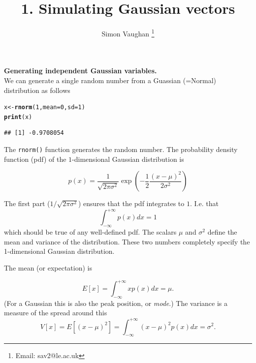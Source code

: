 \documentclass[a4paper,11pt]{article}\usepackage[]{graphicx}\usepackage[]{color}
\makeatletter
\newcommand{\hlnum}[1]{\textcolor[rgb]{0.686,0.059,0.569}{#1}}%
\newcommand{\hlstd}[1]{\textcolor[rgb]{0.345,0.345,0.345}{#1}}%
\newcommand{\hlkwb}[1]{\textcolor[rgb]{0.69,0.353,0.396}{#1}}%
\newcommand{\hlkwc}[1]{\textcolor[rgb]{0.333,0.667,0.333}{#1}}%
\newcommand{\hlkwd}[1]{\textcolor[rgb]{0.737,0.353,0.396}{\textbf{#1}}}%
\newenvironment{kframe}{%
 \def\at@end@of@kframe{}%
 \ifinner\ifhmode%
  \def\at@end@of@kframe{\end{minipage}}%
  \begin{minipage}{\columnwidth}%
 \fi\fi%
 \def\FrameCommand##1{\hskip\@totalleftmargin \hskip-\fboxsep
 \colorbox{shadecolor}{##1}\hskip-\fboxsep
     \hskip-\linewidth \hskip-\@totalleftmargin \hskip\columnwidth}%
 \MakeFramed {\advance\hsize-\width
   \@totalleftmargin\z@ \linewidth\hsize
   \@setminipage}}%
 {\par\unskip\endMakeFramed%
 \at@end@of@kframe}
\newenvironment{knitrout}{}{} %
\makeatother
\begin{document}
\title{1. Simulating Gaussian vectors}
\author{Simon Vaughan \thanks{Email: sav2@le.ac.uk}}
\maketitle

\textbf{Generating independent Gaussian variables.} \\

We can generate a single random number from a Guassian (=Normal) distribution as follows

\begin{knitrout}
\color{fgcolor}\begin{kframe}
\begin{alltt}
  \hlstd{x} \hlkwb{<-} \hlkwd{rnorm}\hlstd{(}\hlnum{1}\hlstd{,} \hlkwc{mean} \hlstd{=} \hlnum{0}\hlstd{,} \hlkwc{sd} \hlstd{=} \hlnum{1}\hlstd{)}
  \hlkwd{print}\hlstd{(x)}
\end{alltt}
\begin{verbatim}
## [1] -0.9708054
\end{verbatim}
\end{kframe}
\end{knitrout}

The {\tt rnorm()} function generates the random number. The probability density function (pdf) of the $1$-dimensional Gaussian distribution is

\begin{equation}
  p(x) = \frac{1}{\sqrt{2 \pi \sigma^2}} 
  \exp \left( -\frac{1}{2} \frac{ (x-\mu)^2 }{ 2\sigma^2 } \right)
  \label{eqn:norm1}
\end{equation}

The first part ($1/\sqrt{2 \pi \sigma^2}$) ensures that the pdf integrates to $1$. I.e. that
\begin{equation}
  \int_{-\infty}^{+\infty} p(x) dx = 1
\end{equation}
which should be true of any well-defined pdf. The scalars $\mu$ and $\sigma^2$ define the mean and variance of the distribution. These two numbers completely specify the 1-dimensional Gaussian distribution. 

The mean (or expectation) is 

\begin{equation}
  E[x] = \int_{-\infty}^{+\infty} x p(x) dx = \mu. 
\end{equation}
(For a Gaussian this is also the peak position, or \emph{mode}.) The variance is a measure of the spread around this
\begin{equation}
 V[x] = E[(x - \mu)^2] = \int_{-\infty}^{+\infty} (x-\mu)^2 p(x) dx = \sigma^2. 
\end{equation}
\end{document}

